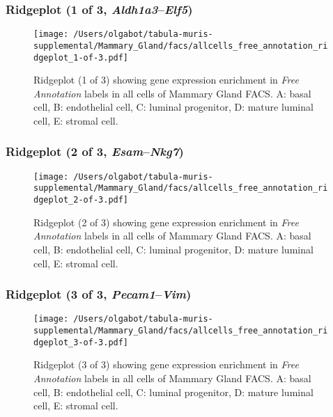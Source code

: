 \clearpage

\subsubsection{Ridgeplot (1 of 3, \emph{Aldh1a3}--\emph{Elf5})}
\begin{figure}[h]
\centering
\texttt{[image: /Users/olgabot/tabula-muris-supplemental/Mammary\_Gland/facs/allcells\_free\_annotation\_ridgeplot\_1-of-3.pdf]}

\caption{ Ridgeplot (1 of 3)  showing gene expression enrichment in \emph{Free Annotation} labels in all cells of Mammary Gland FACS. A: basal cell, B: endothelial cell, C: luminal progenitor, D: mature luminal cell, E: stromal cell.}
\end{figure}


\clearpage

\subsubsection{Ridgeplot (2 of 3, \emph{Esam}--\emph{Nkg7})}
\begin{figure}[h]
\centering
\texttt{[image: /Users/olgabot/tabula-muris-supplemental/Mammary\_Gland/facs/allcells\_free\_annotation\_ridgeplot\_2-of-3.pdf]}

\caption{ Ridgeplot (2 of 3)  showing gene expression enrichment in \emph{Free Annotation} labels in all cells of Mammary Gland FACS. A: basal cell, B: endothelial cell, C: luminal progenitor, D: mature luminal cell, E: stromal cell.}
\end{figure}


\clearpage

\subsubsection{Ridgeplot (3 of 3, \emph{Pecam1}--\emph{Vim})}
\begin{figure}[h]
\centering
\texttt{[image: /Users/olgabot/tabula-muris-supplemental/Mammary\_Gland/facs/allcells\_free\_annotation\_ridgeplot\_3-of-3.pdf]}

\caption{ Ridgeplot (3 of 3)  showing gene expression enrichment in \emph{Free Annotation} labels in all cells of Mammary Gland FACS. A: basal cell, B: endothelial cell, C: luminal progenitor, D: mature luminal cell, E: stromal cell.}
\end{figure}


\clearpage

